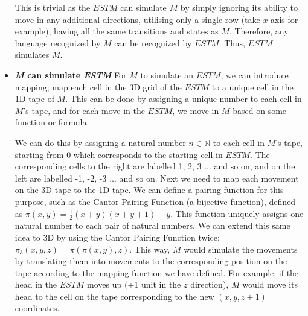 \documentclass[addpoints,a4paper]{exam}
\begin{document}
\begin{questions}
\begin{solution}
\begin{itemize}
            This is trivial as the $ESTM$ can simulate $M$ by simply ignoring its ability to move in any additional directions, utilising only a single row (take $x$-axis for example), having all the same transitions and states as $M$. Therefore, any language recognized by $M$ can be recognized by $ESTM$. Thus, $ESTM$ simulates $M$. 
            
      \item \textbf{\textit{M} can simulate \textit{ESTM}}
            For $M$ to simulate an $ESTM$, we can introduce mapping; map each cell in the 3D grid of the $ESTM$ to a unique cell in the 1D tape of $M$. This can be done by assigning a unique number to each cell in $M$'s tape, and for each move in the $ESTM$, we move in $M$ based on some function or formula. 
            
            We can do this by assigning a natural number $ n \in \mathbb{N} $ to each cell in $M$'s tape, starting from 0 which corresponds to the starting cell in $ESTM$. The corresponding cells to the right are labelled 1, 2, 3 ... and so on, and on the left are labelled -1, -2, -3 ... and so on. Next we need to map each movement on the 3D tape to the 1D tape. We can define a pairing function for this purpose, such as the Cantor Pairing Function (a bijective function), defined as $ \pi(x, y) = \frac{1}{2}(x + y)(x + y + 1) + y $. This function uniquely assigns one natural number to each pair of natural numbers. We can extend this same idea to 3D by using the Cantor Pairing Function twice: $ \pi_3(x, y, z) = \pi(\pi(x, y), z) $. This way, $M$ would simulate the movements by translating them into movements to the corresponding position on the tape according to the mapping function we have defined. For example, if the head in the $ESTM$ moves up (+1 unit in the $z$ direction), $M$ would move its head to the cell on the tape corresponding to the new $ (x, y, z+1) $ coordinates.
            

\end{itemize}
\end{solution}
\end{questions}
\end{document}
